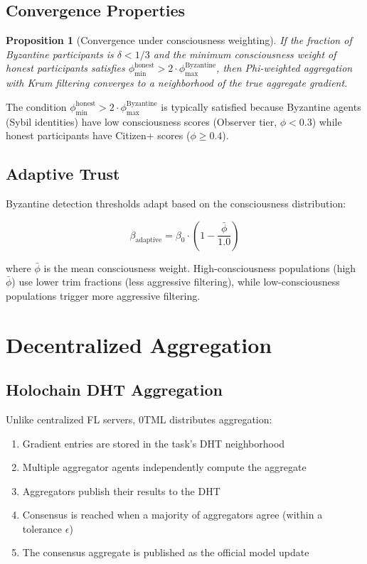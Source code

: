 \documentclass[11pt,twocolumn]{article}
\newtheorem{proposition}{Proposition}
\begin{document}
\subsection{Convergence Properties}

\begin{proposition}[Convergence under consciousness weighting]
If the fraction of Byzantine participants is $\delta < 1/3$ and the
minimum consciousness weight of honest participants satisfies
$\phi_{\min}^{\text{honest}} > 2 \cdot \phi_{\max}^{\text{Byzantine}}$,
then Phi-weighted aggregation with Krum filtering converges to a
neighborhood of the true aggregate gradient.
\end{proposition}

The condition $\phi_{\min}^{\text{honest}} > 2 \cdot \phi_{\max}^{\text{Byzantine}}$
is typically satisfied because Byzantine agents (Sybil identities) have
low consciousness scores (Observer tier, $\phi < 0.3$) while honest
participants have Citizen+ scores ($\phi \geq 0.4$).

\subsection{Adaptive Trust}

Byzantine detection thresholds adapt based on the consciousness distribution:

\begin{equation}
  \beta_{\text{adaptive}} = \beta_0 \cdot \left(1 - \frac{\bar{\phi}}{1.0}\right)
\end{equation}

where $\bar{\phi}$ is the mean consciousness weight. High-consciousness
populations (high $\bar{\phi}$) use lower trim fractions (less aggressive
filtering), while low-consciousness populations trigger more aggressive
filtering.

\section{Decentralized Aggregation}

\subsection{Holochain DHT Aggregation}

Unlike centralized FL servers, 0TML distributes aggregation:

\begin{enumerate}[nosep]
  \item Gradient entries are stored in the task's DHT neighborhood
  \item Multiple aggregator agents independently compute the aggregate
  \item Aggregators publish their results to the DHT
  \item Consensus is reached when a majority of aggregators agree
    (within a tolerance $\epsilon$)
  \item The consensus aggregate is published as the official model update
\end{enumerate}
\end{document}
